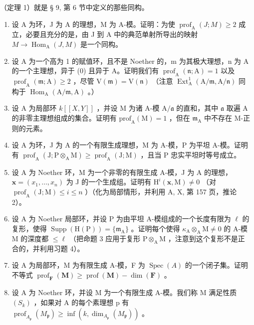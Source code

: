 （定理 1）就是 § 9, 第 6 节中定义的那些同构。



\begin{enumerate}
\def\labelenumi{\arabic{enumi})}
\item
  设 A 为环，J 为 A 的理想，M 为 A-模。证明：为使 \(\operatorname{prof}_{\mathrm{A}}(J;M)\geqslant2\) 成立，必要且充分的是，由 J 到 A 中的典范单射所导出的映射 \(M\to\operatorname{Hom}_{\mathrm{A}}(J,M)\) 是一个同构。
\item
  设 A 为一个高为 1 的赋值环，且不是 Noether 的，m 为其极大理想，n 为 A 的一个主理想，异于 (0) 且异于 A。证明我们有 \(\operatorname{prof}_{\mathrm{A}}(\mathfrak{n};\mathrm{A})=1\) 以及 \(\operatorname{prof}_{\mathrm{A}}(\mathfrak{m};\mathrm{A})\geqslant2\) ，尽管 \(\mathrm{V}(\mathfrak{m})=\mathrm{V}(\mathfrak{n})\) （注意 \(\operatorname{Ext}_{\mathrm{A}}^{1}(\mathrm{A}/\mathfrak{m},\mathrm{A}/\mathfrak{n})\) 同构于 \(\operatorname{Hom}_{\mathrm{A}}(\mathrm{A}/\mathfrak{m},\mathrm{A})\) 。）
\item
  设 A 为局部环 \(k[[X,Y]]\) ，并设 M 为诸 A-模 \(\mathrm{A}/\mathfrak{a}\) 的直和，其中 \(\mathfrak{a}\) 取遍 A 的非零主理想组成的集合。证明有 \(\mathrm{prof}_{\mathrm{A}}(\mathrm{M}) = 1\) ，但在 \(\mathfrak{m}_{\mathrm{A}}\) 中不存在 M-正则的元素。
\item
  设 A 为环，J 为 A 的一个有限生成理想，M 为 A-模，P 为平坦 A-模。证明有 \(\operatorname{prof}_{\mathrm{A}}(\mathrm{J};\mathrm{P}\otimes_{\mathrm{A}}\mathrm{M})\geqslant\operatorname{prof}_{\mathrm{A}}(\mathrm{J};\mathrm{M})\) ，且当 P 忠实平坦时等号成立。
\item
  设 \(\mathrm{A}\) 为 Noether 环，M 为一个非零的有限生成 A-模，J 为 \(\mathrm{A}\) 的理想，\(\mathbf{x} = (x_1, \ldots, x_n)\) 为 J 的一个生成组。证明有 \(\mathrm{H}^i(\mathbf{x}, \mathrm{M}) \neq 0\) （对 \(\operatorname{prof}_{\mathrm{A}}(\mathrm{J}; \mathrm{M}) \leqslant i \leqslant n\) ）（化为局部情形，并利用 A, X, 第 157 页，推论 2）。
\item
  设 A 为 Noether 局部环，并设 P 为由平坦 A-模组成的一个长度有限为 \(\ell\) 的复形，使得 \(\operatorname{Supp}(\mathrm{H}(\mathrm{P})) = \{\mathfrak{m}_{\mathrm{A}}\}\) 。证明每个使得 \(\kappa_{\mathrm{A}} \otimes_{\mathrm{A}} \mathrm{M} \neq 0\) 的 A-模 M 的深度都 \(\leqslant \ell\) （把命题 3 应用于复形 \(\mathrm{P} \otimes_{\mathrm{A}} \mathrm{M}\) ，注意到这个复形不是正合的，并利用习题 4）。
\item
  设 A 为局部环，M 为有限生成 A-模，F 为 \(\operatorname{Spec}(A)\) 的一个闭子集。证明不等式 \(\operatorname{prof}_{\mathbf{F}}(\mathbf{M}) \geqslant \operatorname{prof}(\mathbf{M}) - \dim(\mathbf{F})\) 。
\item
  设 A 为 Noether 环，并设 M 为一个有限生成 A-模。我们称 M 满足性质 \((S_{k})\) ，如果对 A 的每个素理想 p 有 \(\operatorname{prof}_{A_{\mathfrak{p}}}(M_{\mathfrak{p}}) \geqslant \inf(k, \dim_{A_{\mathfrak{p}}}(M_{\mathfrak{p}}))\) 。
\end{enumerate}

